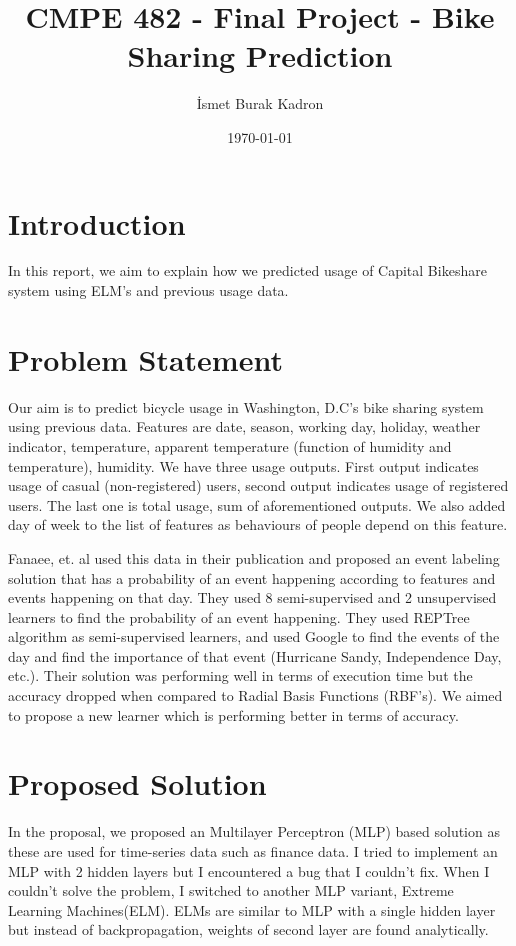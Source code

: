 \documentclass[11pt]{article} %
\title{CMPE 482 - Final Project - Bike Sharing Prediction}
\author{İsmet Burak Kadron}
\date{\today} %
\begin{document}
\maketitle

\section{Introduction}
In this report, we aim to explain how we predicted usage of Capital Bikeshare system using ELM's and previous usage data.

\section{Problem Statement}
Our aim is to predict bicycle usage in Washington, D.C's bike sharing system using previous data. Features are date, season, working day, holiday, weather indicator, temperature, apparent temperature (function of humidity and temperature), humidity. We have three usage outputs. First output indicates usage of casual (non-registered) users, second output indicates usage of registered users. The last one is total usage, sum of aforementioned outputs. We also added day of week to the list of features as behaviours of people depend on this feature.

Fanaee, et. al used this data in their publication and proposed an event labeling solution that has a probability of an event happening according to features and events happening on that day. They used 8 semi-supervised and 2 unsupervised learners to find the probability of an event happening. They used REPTree algorithm as semi-supervised learners, and used Google to find the events of the day and find the importance of that event (Hurricane Sandy, Independence Day, etc.). Their solution was performing well in terms of execution time but the accuracy dropped when compared to Radial Basis Functions (RBF's). We aimed to propose a new learner which is performing better in terms of accuracy. \cite{fanaee2014event}

\section{Proposed Solution}
In the proposal, we proposed an Multilayer Perceptron (MLP) based solution as these are used for time-series data such as finance data. I tried to implement an MLP with 2 hidden layers but I encountered a bug that I couldn't fix. When I couldn't solve the problem, I switched to another MLP variant, Extreme Learning Machines(ELM). ELMs are similar to MLP with a single hidden layer but instead of backpropagation, weights of second layer are found analytically.
\end{document}
